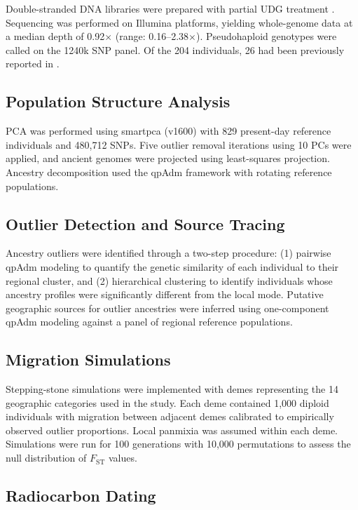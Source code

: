 \documentclass[11pt]{article}
\begin{document}
Double-stranded DNA libraries were prepared with partial UDG treatment \citep{rohland2015partial}. Sequencing was performed on Illumina platforms, yielding whole-genome data at a median depth of 0.92$\times$ (range: 0.16--2.38$\times$). Pseudohaploid genotypes were called on the 1240k SNP panel. Of the 204 individuals, 26 had been previously reported in \citet{moots2023genetic}.

\subsection{Population Structure Analysis}

PCA was performed using smartpca (v1600) with 829 present-day reference individuals and 480,712 SNPs. Five outlier removal iterations using 10 PCs were applied, and ancient genomes were projected using least-squares projection. Ancestry decomposition used the qpAdm framework \citep{patterson2012ancient} with rotating reference populations.

\subsection{Outlier Detection and Source Tracing}

Ancestry outliers were identified through a two-step procedure: (1) pairwise qpAdm modeling to quantify the genetic similarity of each individual to their regional cluster, and (2) hierarchical clustering to identify individuals whose ancestry profiles were significantly different from the local mode. Putative geographic sources for outlier ancestries were inferred using one-component qpAdm modeling against a panel of regional reference populations.

\subsection{Migration Simulations}

Stepping-stone simulations were implemented with demes representing the 14 geographic categories used in the study. Each deme contained 1,000 diploid individuals with migration between adjacent demes calibrated to empirically observed outlier proportions. Local panmixia was assumed within each deme. Simulations were run for 100 generations with 10,000 permutations to assess the null distribution of $F_{\text{ST}}$ values.

\subsection{Radiocarbon Dating}
\end{document}
